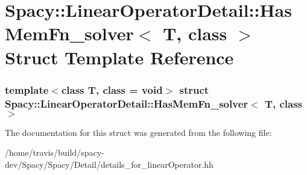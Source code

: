 \hypertarget{structSpacy_1_1LinearOperatorDetail_1_1HasMemFn__solver}{\section{\-Spacy\-:\-:\-Linear\-Operator\-Detail\-:\-:\-Has\-Mem\-Fn\-\_\-solver$<$ \-T, class $>$ \-Struct \-Template \-Reference}
\label{structSpacy_1_1LinearOperatorDetail_1_1HasMemFn__solver}
}
\subsubsection*{template$<$class T, class = void$>$ struct Spacy\-::\-Linear\-Operator\-Detail\-::\-Has\-Mem\-Fn\-\_\-solver$<$ T, class $>$}



\-The documentation for this struct was generated from the following file\-:\begin{DoxyCompactItemize}
\item 
/home/travis/build/spacy-\/dev/\-Spacy/\-Spacy/\-Detail/details\-\_\-for\-\_\-linear\-Operator.\-hh\end{DoxyCompactItemize}
